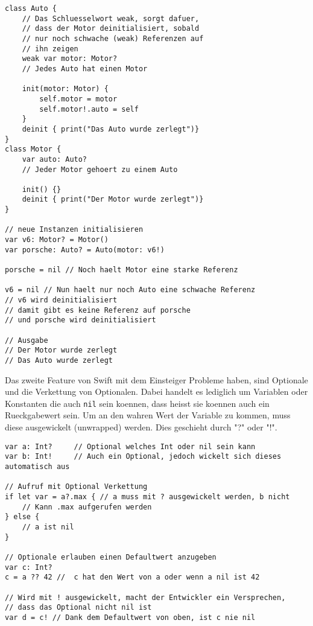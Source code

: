 \begin{lstlisting}
class Auto {
    // Das Schluesselwort weak, sorgt dafuer,
    // dass der Motor deinitialisiert, sobald
    // nur noch schwache (weak) Referenzen auf
    // ihn zeigen
    weak var motor: Motor? 
    // Jedes Auto hat einen Motor
    
    init(motor: Motor) {
        self.motor = motor
        self.motor!.auto = self
    }
    deinit { print("Das Auto wurde zerlegt")}
}
class Motor {
    var auto: Auto? 
    // Jeder Motor gehoert zu einem Auto
    
    init() {}
    deinit { print("Der Motor wurde zerlegt")}
}

// neue Instanzen initialisieren
var v6: Motor? = Motor()
var porsche: Auto? = Auto(motor: v6!)

porsche = nil // Noch haelt Motor eine starke Referenz

v6 = nil // Nun haelt nur noch Auto eine schwache Referenz
// v6 wird deinitialisiert
// damit gibt es keine Referenz auf porsche
// und porsche wird deinitialisiert

// Ausgabe
// Der Motor wurde zerlegt
// Das Auto wurde zerlegt
\end{lstlisting}
Das zweite Feature von Swift mit dem Einsteiger Probleme haben, sind Optionale und die Verkettung von Optionalen. Dabei handelt es lediglich um Variablen oder Konstanten die auch \lstinline{nil} sein koennen, dass heisst sie koennen auch ein Rueckgabewert sein. Um an den wahren Wert der Variable zu kommen, muss diese ausgewickelt (unwrapped) werden. Dies geschieht durch "?" oder "!". 
\begin{lstlisting}
var a: Int? 	// Optional welches Int oder nil sein kann
var b: Int! 	// Auch ein Optional, jedoch wickelt sich dieses automatisch aus

// Aufruf mit Optional Verkettung
if let var = a?.max { // a muss mit ? ausgewickelt werden, b nicht
	// Kann .max aufgerufen werden
} else {
	// a ist nil
}

// Optionale erlauben einen Defaultwert anzugeben
var c: Int?
c = a ?? 42 //  c hat den Wert von a oder wenn a nil ist 42

// Wird mit ! ausgewickelt, macht der Entwickler ein Versprechen,
// dass das Optional nicht nil ist
var d = c! // Dank dem Defaultwert von oben, ist c nie nil
\end{lstlisting}
